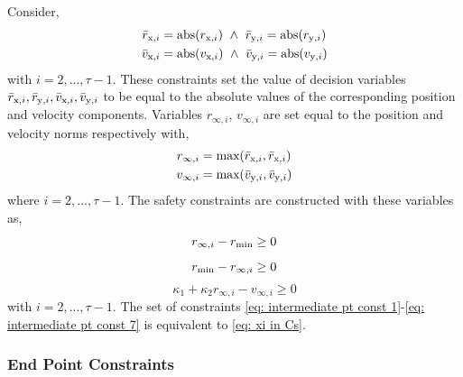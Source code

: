 \documentclass[twocolumn,letterpaper]{IEEEAerospaceCLS}  %
\theoremstyle{definition}
\begin{document}
Consider, 
\begin{align} 
  \bar{r}_{{\rm x},i} &= \text{abs}({r}_{{\rm x},i}) \,\,\wedge \,\, 
  \bar{r}_{{\rm y},i} = \text{abs}({r}_{{\rm y},i}) \label{eq: intermediate pt const 1}\\
  \bar{v}_{{\rm x},i} &= \text{abs}({v}_{{\rm x},i}) \,\,\wedge \,\, 
  \bar{v}_{{\rm y},i} = \text{abs}({v}_{{\rm y},i}) \label{eq: intermediate pt const 2}
\end{align}
with $i=2,...,\tau-1$. These constraints set the value of decision variables $\bar{r}_{{\rm x},i},\bar{r}_{{\rm y},i},\bar{v}_{{\rm x},i},\bar{v}_{{\rm y},i}$ to be equal to the absolute values of the corresponding position and velocity components. 
Variables $r_{\infty,i}$, $v_{\infty,i}$ are set equal to the position and velocity norms respectively with, 
\begin{align}
  r_{\infty, i } &= \text{max}(\bar{r}_{{\rm x},i}, \bar{r}_{{\rm x},i}) \label{eq: intermediate pt const 3}\\ 
  v_{\infty, i } &= \text{max}(\bar{v}_{{\rm y},i}, \bar{v}_{{\rm y},i}) \label{eq: intermediate pt const 4}
\end{align}
where $i=2,...,\tau-1$. 
The safety constraints are constructed with these variables as, 
\begin{equation} \label{eq: intermediate pt const 5}
  r_{\infty, i } - r_{\rm min} \geq 0 
\end{equation}
\begin{equation} \label{eq: intermediate pt const 6}
  r_{\rm min} - r_{\infty, i } \geq 0 
\end{equation}
\begin{equation} \label{eq: intermediate pt const 7}
  \kappa_1 + \kappa_2 r_{\infty, i } - v_{\infty, i} \geq 0 
\end{equation}
with $i=2,...,\tau-1$. 
The set of constraints \eqref{eq: intermediate pt const 1}-\eqref{eq: intermediate pt const 7}
is equivalent to \eqref{eq: xi in Cs}. 

 

\subsubsection{End Point Constraints}
\end{document}
